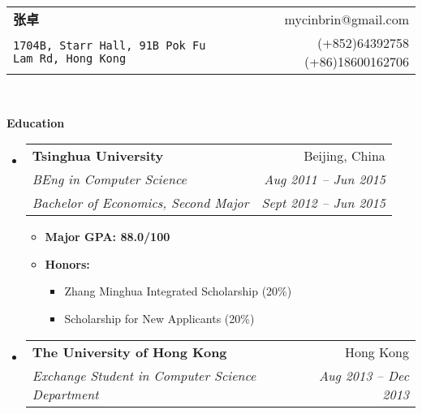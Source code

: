 \documentclass[letterpaper,11pt,adobefonts]{ctexart}
\makeatletter
\newcommand{\resitem}[1]{\item #1 \vspace{-2pt}}
\newcommand{\resheading}[1]{{\large \colorbox{mygrey}{\begin{minipage}{\textwidth}{\textbf{#1 \vphantom{p\^{E}}}}\end{minipage}}}}
\newcommand{\ressubheading}[4]{
\begin{tabular*}{6.5in}{l@{\extracolsep{\fill}}r}
        \textbf{#1} & #2 \\
        \textit{#3} & \textit{#4} \\
\end{tabular*}\vspace{-6pt}}
\newcommand{\ressubheadingg}[6]{
\begin{tabular*}{6.5in}{l@{\extracolsep{\fill}}r}
        \textbf{#1} & #2 \\
        \textit{#3} & \textit{#4} \\
        \textit{#5} & \textit{#6} \\
\end{tabular*}\vspace{-6pt}}
\makeatother
\begin{document}
\newcommand{\mywebheader}{
\begin{tabular*}{7in}{l@{\extracolsep{\fill}}r}
    \textbf{{\LARGE 张卓}} & {mycinbrin@gmail.com}\\
    {\footnotesize \texttt{1704B, Starr Hall, 91B Pok Fu Lam Rd, Hong Kong}} & {(+852)64392758 (+86)18600162706}
    \end{tabular*}
\\
\vspace{0.1in}}

\mywebheader

\resheading{Education}
    \begin{itemize}
            \item
                \ressubheadingg{{Tsinghua University}}{Beijing, China}{{BEng in Computer Science}}{Aug 2011 -- Jun 2015}{Bachelor of Economics, Second Major}{Sept 2012 -- Jun 2015}
                { \footnotesize
                \begin{itemize}
                        \resitem{\textbf{Major GPA: 88.0/100}}
                        \resitem{\textbf{Honors:}} 
                        \begin{itemize}
                                \resitem{Zhang Minghua Integrated Scholarship (20\%) }
                                \resitem{Scholarship for New Applicants (20\%) }
                        \end{itemize}
                \end{itemize}
                }
            \item
                \ressubheading{{The University of Hong Kong}}{Hong Kong}{Exchange Student in Computer Science Department}{Aug 2013 -- Dec 2013}
    \end{itemize} %
\end{document}
